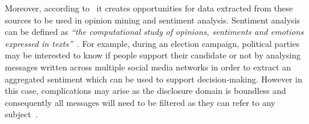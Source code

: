 Moreover, according to~\cite{rep:LERC} it creates opportunities for data extracted from these sources to be used in opinion mining and sentiment analysis. Sentiment analysis can be defined as \emph{``the computational study of opinions, sentiments and emotions expressed in texts''}~\parencite{inbook:lang_proc_sec}.  For example, during an election campaign, political parties may be interested to know if people support their candidate or not by analysing messages written across multiple social media networks in order to extract an aggregated sentiment which can be used to support decision-making. However in this case, complications may arise as the disclosure domain is boundless and consequently all messages will need to be filtered as they can refer to any subject~\parencite{art:computers_human_behaviour}.
